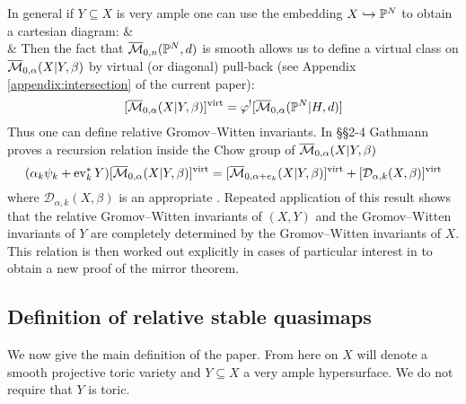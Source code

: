 In general if $Y \subseteq X$ is very ample one can use the embedding $X \hookrightarrow \mathbb P^N$ to obtain a cartesian diagram:
\bcd
{} \ar[r] \ar[d]  &  \ar[d] \\
 \ar[r,"\varphi"] & 
\ecd
Then the fact that $\overline{\mathcal M}_{0,n}(\mathbb P^N,d)$ is smooth allows us to define a virtual class on $\overline{\mathcal M}_{0,\alpha}(X|Y,\beta)$ by virtual (or diagonal) pull-back (see Appendix \ref{appendix:intersection} of the current paper):
\begin{equation*} [\overline{\mathcal M}_{0,\alpha}(X|Y,\beta)]^{\operatorname{virt}} = \varphi^! [\overline{\mathcal M}_{0,\alpha}(\mathbb P^N|H,d)] \end{equation*}
Thus one can define relative Gromov--Witten invariants. In \S\S 2-4 Gathmann proves a recursion relation inside the Chow group of $\overline{\mathcal M}_{0,\alpha}(X|Y,\beta)$
\begin{equation*} (\alpha_k \psi_k + \operatorname{ev}_k^* Y) [\overline{\mathcal M}_{0,\alpha}(X|Y,\beta)]^{\operatorname{virt}} = [\overline{\mathcal M}_{0,\alpha+e_k}(X|Y,\beta)]^{\operatorname{virt}} + [\mathcal{D}_{\alpha,k}(X,\beta)]^{\operatorname{virt}} \end{equation*}
where $\mathcal{D}_{\alpha,k}(X,\beta)$ is an appropriate . Repeated application of this result shows that the relative Gromov--Witten invariants of $(X,Y)$ and the Gromov--Witten invariants of $Y$ are completely determined by the Gromov--Witten invariants of $X$. This relation is then worked out explicitly in cases of particular interest in \cite{Ga-MF} to obtain a new proof of the mirror theorem.

\subsection{Definition of relative stable quasimaps} \label{Subsection relative stable quasimaps}

We now give the main definition of the paper. From here on $X$ will denote a smooth projective toric variety and $Y \subseteq X$ a very ample hypersurface. We do not require that $Y$ is toric.

